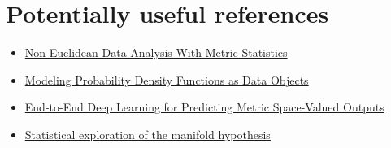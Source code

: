 \section*{Potentially useful references}

\begin{itemize}
    \item \href{10.1162/99608f92.867d3e52}{Non-Euclidean Data Analysis With Metric Statistics}
    \item \href{https://doi.org/10.1016/j.ecosta.2021.04.004}{Modeling Probability Density Functions as Data Objects}
    \item \href{https://arxiv.org/pdf/2509.23544}{End-to-End Deep Learning for Predicting Metric
Space-Valued Outputs}
    \item \href{https://doi.org/10.1093/jrsssb/qkag055}{Statistical exploration of the manifold hypothesis}
\end{itemize}